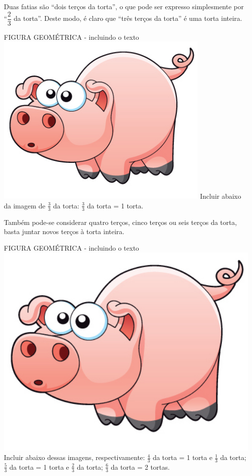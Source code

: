 \documentclass[a4,12pt]{book}
\begin{document}
Duas fatias são ``dois terços da torta'', o que pode ser expresso simplesmente por ``$\dfrac{2}{3}$ da torta''. Deste modo, é claro que ``três terços da torta'' é uma torta inteira.

\begin{imagem*}[breakable]{}{}   FIGURA GEOMÉTRICA - incluindo o texto  \mbox{} \newline        \includegraphics[width=300pt, keepaspectratio]{pig}  
  Incluir abaixo da imagem de   $\frac{3}{3}$   da torta:   $\frac{3}{3}$   da torta = 1 torta.\end{imagem*}

Também pode-se considerar quatro terços, cinco terços ou seis terços da torta, basta juntar novos terços à torta inteira.

\begin{imagem*}[breakable]{}{}    FIGURA GEOMÉTRICA - incluindo o texto  \mbox{} \newline         \includegraphics[width=540pt, keepaspectratio]{pig}  
  Incluir abaixo dessas imagens, respectivamente:  
  $\frac{4}{3}$   da torta = 1 torta e   $\frac{1}{3}$   da torta;  
  $\frac{5}{3}$   da torta = 1 torta e   $\frac{2}{3}$   da torta;  
  $\frac{6}{3}$   da torta = 2 tortas.  
\end{imagem*}
\end{document}
